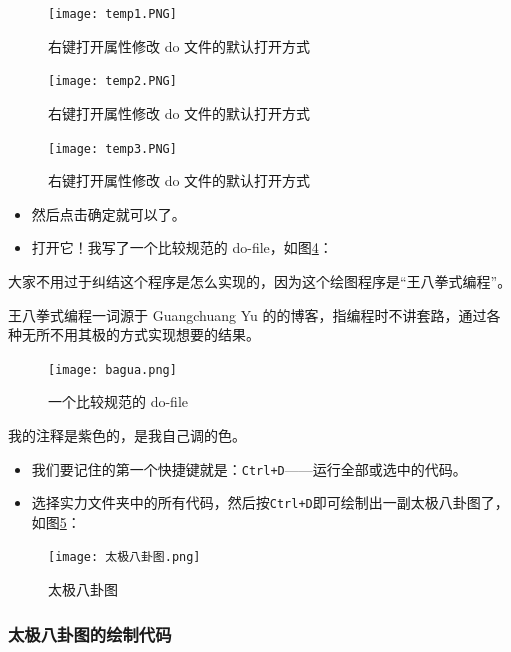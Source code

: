 \documentclass[cn,fancy,blue,11pt]{elegantbook}
\begin{document}
\begin{figure}[htbp]
  \centering
  \texttt{[image: temp1.PNG]}
  \caption{右键打开属性修改 do 文件的默认打开方式}
  \label{fig:temp1}
\end{figure}

\begin{figure}[htbp]
  \centering
  \texttt{[image: temp2.PNG]}
  \caption{右键打开属性修改 do 文件的默认打开方式}
  \label{fig:temp2}
\end{figure}

\begin{figure}[htbp]
  \centering
  \texttt{[image: temp3.PNG]}
  \caption{右键打开属性修改 do 文件的默认打开方式}
  \label{fig:temp3}
\end{figure}

\begin{itemize}
\item
  然后点击确定就可以了。
\item
  打开它！我写了一个比较规范的 do-file，如图\ref{fig:bagua}：
\end{itemize}

大家不用过于纠结这个程序是怎么实现的，因为这个绘图程序是“王八拳式编程”。

\begin{note}
  王八拳式编程一词源于 Guangchuang Yu 的的博客，指编程时不讲套路，通过各种无所不用其极的方式实现想要的结果。
\end{note}

\begin{figure}[htbp]
  \centering
  \texttt{[image: bagua.png]}
  \caption{一个比较规范的 do-file}
  \label{fig:bagua}
\end{figure}

我的注释是紫色的，是我自己调的色。

\begin{itemize}
\item
  我们要记住的第一个快捷键就是：\lstinline{Ctrl+D}------运行全部或选中的代码。
\item
  选择实力文件夹中的所有代码，然后按\lstinline{Ctrl+D}即可绘制出一副太极八卦图了，如图\ref{fig:bagua2}：
\end{itemize}

\begin{figure}[htbp]
  \centering
  \texttt{[image: 太极八卦图.png]}
  \caption{太极八卦图}
  \label{fig:bagua2}
\end{figure}

\hypertarget{section-10}{%
\subsubsection{太极八卦图的绘制代码}\label{section-10}}
\end{document}
